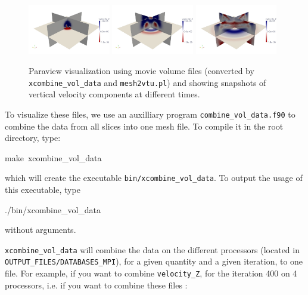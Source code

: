 \begin{figure}[htbp]
\noindent \begin{centering}
\includegraphics[width=0.32\textwidth]{figures/movie_volume_1.jpg}
\includegraphics[width=0.32\textwidth]{figures/movie_volume_2.jpg}
\includegraphics[width=0.32\textwidth]{figures/movie_volume_3.jpg}
\par\end{centering}

\caption{Paraview visualization using movie volume files (converted by \texttt{xcombine\_vol\_data}
and \texttt{mesh2vtu.pl}) and showing snapshots of vertical velocity
components at different times.}


\label{fig:movie.volume}
\end{figure}


To visualize these files, we use an auxilliary program \texttt{combine\_vol\_data.f90}
to combine the data from all slices into one mesh file. To compile
it in the root directory, type:
\begin{lyxcode}
{\footnotesize make~xcombine\_vol\_data~}{\footnotesize \par}
\end{lyxcode}
which will create the executable \texttt{bin/xcombine\_vol\_data}.
To output the usage of this executable, type
\begin{lyxcode}
{\footnotesize ./bin/xcombine\_vol\_data~}{\footnotesize \par}
\end{lyxcode}
without arguments.

\medskip

\texttt{xcombine\_vol\_data} will combine the data on the different processors (located in \texttt{OUTPUT\_FILES/DATABASES\_MPI}), for a given quantity and a given iteration, to one file. For example, if you want to combine \texttt{velocity\_Z}, for the iteration 400 on 4 processors, i.e. if you want to combine these files :


